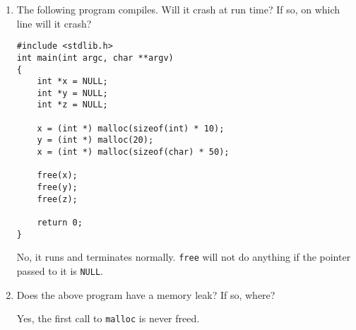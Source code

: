 \begin{enumerate}
\item The following program compiles. Will it crash at run time? If so, on which line will it crash?

\begin{lstlisting}
#include <stdlib.h>
int main(int argc, char **argv)
{
	int *x = NULL;
	int *y = NULL;
	int *z = NULL;

	x = (int *) malloc(sizeof(int) * 10);
	y = (int *) malloc(20);
	x = (int *) malloc(sizeof(char) * 50);

	free(x);
	free(y);
	free(z);

	return 0;
}
\end{lstlisting}

\begin{answer}
No, it runs and terminates normally.
\texttt{free} will not do anything if the pointer passed to it is \texttt{NULL}.
\end{answer}

\item Does the above program have a memory leak? If so, where?

\begin{answer}
Yes, the first call to \texttt{malloc} is never freed.
\end{answer}
\end{enumerate}
